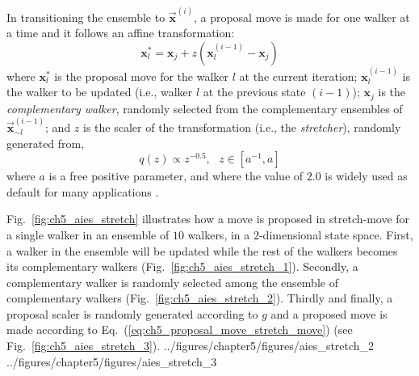 In transitioning the ensemble to $\vec{\bm{x}}^{(i)}$,
a proposal move is made for one walker at a time and it follows an affine transformation:
\begin{equation}
	\bm{x}_l^* = \bm{x}_j + z (\bm{x}_l^{(i-1)} - \bm{x}_j)
\label{eq:ch5_proposal_move_stretch_move}
\end{equation}
where $\bm{x}_l^*$ is the proposal move for the walker $l$ at the current iteration;
$\bm{x}_l^{(i-1)}$ is the walker to be updated (i.e., walker $l$ at the previous state $(i-1)$);
$\bm{x}_j$ is the \emph{complementary walker}, randomly selected from the complementary ensembles of $\vec{\bm{x}}^{(i-1)}_{\sim l}$;
and $z$ is the scaler of the transformation (i.e., the \emph{stretcher}), randomly generated from,
\begin{equation}
	q(z) \propto z^{-0.5}, \,\,\,\, z \in [a^{-1}, a]
\label{eq:ch5_scaler_distribution}
\end{equation}
where $a$ is a free positive parameter,
and where the value of $2.0$ is widely used as default for many applications \cite{Goodman2010,Hou2012,Allison2013,Foreman-Mackey2013,Akeret2013}.

Fig.~\ref{fig:ch5_aies_stretch} illustrates how a move is proposed in stretch-move for a single walker in an ensemble of $10$ walkers, in a $2$-dimensional state space.
First, a walker in the ensemble will be updated while the rest of the walkers becomes its complementary walkers (Fig.~\ref{fig:ch5_aies_stretch_1}).
Secondly, a complementary walker is randomly selected among the ensemble of complementary walkers (Fig.~\ref{fig:ch5_aies_stretch_2}).
Thirdly and finally,
a proposal scaler is randomly generated according to $g$ and a proposed move is made according to Eq.~(\ref{eq:ch5_proposal_move_stretch_move}) (see Fig.~\ref{fig:ch5_aies_stretch_3}).
{../figures/chapter5/figures/aies_stretch_2}
{../figures/chapter5/figures/aies_stretch_3}

